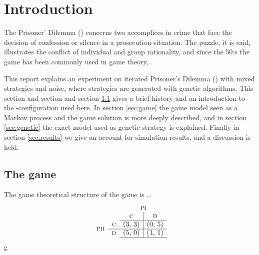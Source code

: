 \section{Introduction}\label{sec:intro}
The Prisoner' Dilemma (\pd) concerns two accomplices in crime that face the decision of confession or silence in a prosecution situation. The puzzle, it is said, illustrates the conflict of individual and group rationality, and since the 50:s the game has been commonly used in game theory, \cite{stanford:pd}.\mypar


This report explains an experiment on iterated Prisoner's Dilemma (\pd) with mixed strategies and noise, where strategies are generated with genetic algorithms. This section and section and section \ref{sec:intro:game} gives a brief history and an introduction to the \pd-configuration used here. In section \ref{sec:game} the game model seen as a Markov process and the game solution is more deeply described, and in section \ref{sec:genetic} the exact model used as genetic strategy is explained. Finally in section \ref{sec:results} we give an account for simulation results, and a discussion is held.

\subsection{The game}\label{sec:intro:game}
The game theoretical structure of the game is \dots \pone \ptwo
\begin{equation}
\begin{array}{cc c|c}
                     &            & \multicolumn{2}{c}{\pone} \\
                     &            & \textsc{c} & \textsc{d}   \\ \cline{3-4}
\multirow{2}*{\ptwo} & \textsc{c} & $(3, 3)$   & $(0, 5)$     \\ \cline{2-4}
		     & \textsc{d} & $(5, 0)$   & $(1, 1)$     \\ \cline{3-4}
\end{array}
\label{equ:intro:payoff}
\end{equation}
g








